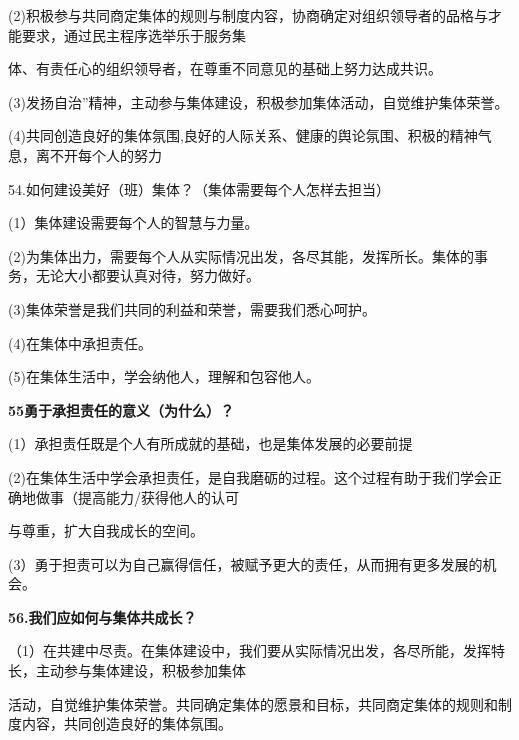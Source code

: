 \documentclass[lang=cn,11pt]{elegantbook}
\begin{document}
(2)积极参与共同商定集体的规则与制度内容，协商确定对组织领导者的品格与才能要求，通过民主程序选举乐于服务集\par

体、有责任心的组织领导者，在尊重不同意见的基础上努力达成共识。\par

(3)发扬自治”精神，主动参与集体建设，积极参加集体活动，自觉维护集体荣誉。\par

(4)共同创造良好的集体氛围,良好的人际关系、健康的舆论氛围、积极的精神气息，离不开每个人的努力\par

54.如何建设美好（班）集体？（集体需要每个人怎样去担当）\par

(1）集体建设需要每个人的智慧与力量。\par

(2)为集体出力，需要每个人从实际情况出发，各尽其能，发挥所长。集体的事务，无论大小都要认真对待，努力做好。\par

(3)集体荣誉是我们共同的利益和荣誉，需要我们悉心呵护。\par

(4)在集体中承担责任。\par

(5)在集体生活中，学会纳他人，理解和包容他人。\par

\textbf{55勇于承担责任的意义（为什么）？}\par

(1）承担责任既是个人有所成就的基础，也是集体发展的必要前提\par

(2)在集体生活中学会承担责任，是自我磨砺的过程。这个过程有助于我们学会正确地做事（提高能力/获得他人的认可\par

与尊重，扩大自我成长的空间。\par

(3）勇于担责可以为自己赢得信任，被赋予更大的责任，从而拥有更多发展的机会。\par

\textbf{56.我们应如何与集体共成长？}\par

（1）在共建中尽责。在集体建设中，我们要从实际情况出发，各尽所能，发挥特长，主动参与集体建设，积极参加集体\par

活动，自觉维护集体荣誉。共同确定集体的愿景和目标，共同商定集体的规则和制度内容，共同创造良好的集体氛围。\par
\end{document}
